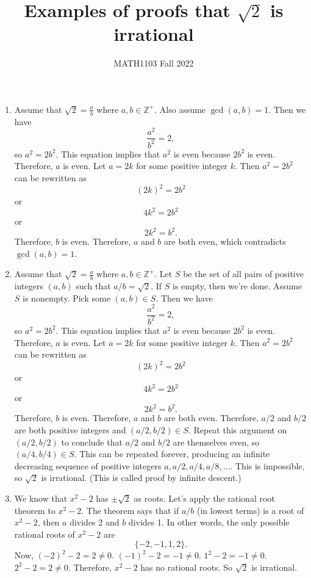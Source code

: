 \documentclass[12pt]{article}
\title{Examples of proofs that $\sqrt{2}$ is irrational}
\author{MATH1103 Fall 2022}
\begin{document}
\maketitle

\begin{enumerate}
    \item Assume that $\sqrt2=\frac{a}{b}$ where $a,b\in\mathbb Z^+$. Also assume $\gcd(a,b)=1$. Then we have
    \[\frac{a^2}{b^2}=2,\]
    so $a^2=2b^2$. This equation implies that $a^2$ is even because $2b^2$ is even. Therefore, $a$ is even. Let $a=2k$ for some positive integer $k$. Then $a^2=2b^2$ can be rewritten as
    \[(2k)^2=2b^2\]
    or
    \[4k^2=2b^2\]
    or
    \[2k^2=b^2.\]
    Therefore, $b$ is even. Therefore, $a$ and $b$ are both even, which contradicts $\gcd(a,b)=1$.

    \item Assume that $\sqrt2=\frac{a}{b}$ where $a,b\in\mathbb Z^+$. Let $S$ be the set of all pairs of positive integers $(a,b)$ such that $a/b=\sqrt2$. If $S$ is empty, then we're done. Assume $S$ is nonempty. Pick some $(a,b)\in S$. Then we have
    \[\frac{a^2}{b^2}=2,\]
    so $a^2=2b^2$. This equation implies that $a^2$ is even because $2b^2$ is even. Therefore, $a$ is even. Let $a=2k$ for some positive integer $k$. Then $a^2=2b^2$ can be rewritten as
    \[(2k)^2=2b^2\]
    or
    \[4k^2=2b^2\]
    or
    \[2k^2=b^2.\]
    Therefore, $b$ is even. Therefore, $a$ and $b$ are both even. Therefore, $a/2$ and $b/2$ are both positive integers and $(a/2, b/2)\in S$. Repeat this argument on $(a/2,b/2)$ to conclude that $a/2$ and $b/2$ are themselves even, so $(a/4,b/4)\in S$. This can be repeated forever, producing an infinite decreasing sequence of positive integers $a, a/2, a/4, a/8, \dots$. This is impossible, so $\sqrt2$ is irrational. (This is called proof by infinite descent.)

    \item We know that $x^2-2$ has $\pm\sqrt2$ as roots. Let's apply the rational root theorem to $x^2-2$. The theorem says that if $a/b$ (in lowest terms) is a root of $x^2-2$, then $a$ divides 2 and $b$ divides 1. In other words, the only possible rational roots of $x^2-2$ are
    \[\{-2,-1,1,2\}.\]
    Now, $(-2)^2-2=2\neq0$. $(-1)^2-2=-1\neq 0$. $1^2-2=-1\neq 0$. $2^2-2=2\neq0$. Therefore, $x^2-2$ has no rational roots. So $\sqrt2$ is irrational.


\end{enumerate}
\end{document}
